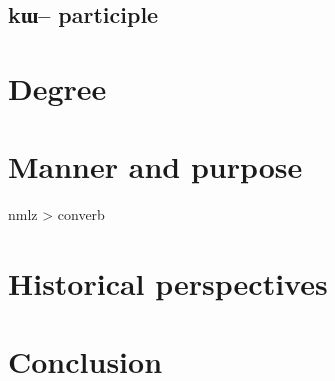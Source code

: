 \documentclass[oldfontcommands,oneside,a4paper,11pt]{article}
\newcommand{\ipa}[1]{{\phon #1}} %
\begin{document}
\subsection{\ipa{kɯ--} participle} 

\section{Degree} \label{sec:degree}
\section{Manner and purpose} \label{sec:linking}
\citet{jacques14linking}
 nmlz > converb
 
\section{Historical perspectives} \label{sec:historical}
 \citet{konnerth09nmlz} 
 
 
\section{Conclusion}



\end{document}
